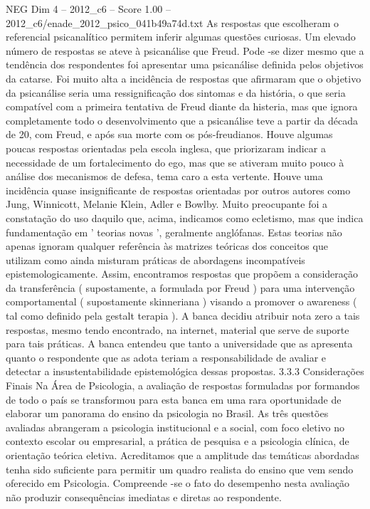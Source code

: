 \begin{textsample}{NEG Dim 4 – 2012\_c6 – Score 1.00 – 2012\_c6/enade\_2012\_psico\_041b49a74d.txt}
As respostas que escolheram o referencial psicanalítico permitem inferir algumas questões curiosas.
Um elevado número de respostas se ateve à psicanálise que Freud.
Pode -se dizer mesmo que a tendência dos respondentes foi apresentar uma psicanálise definida pelos objetivos da catarse.
Foi muito alta a incidência de respostas que afirmaram que o objetivo da psicanálise seria uma ressignificação dos sintomas e da história, o que seria compatível com a primeira tentativa de Freud diante da histeria, mas que ignora completamente todo o desenvolvimento que a psicanálise teve a partir da década de 20, com Freud, e após sua morte com os pós-freudianos.
Houve algumas poucas respostas orientadas pela escola inglesa, que priorizaram indicar a necessidade de um fortalecimento do ego, mas que se ativeram muito pouco à análise dos mecanismos de defesa, tema caro a esta vertente.
Houve uma incidência quase insignificante de respostas orientadas por outros autores como Jung, Winnicott, Melanie Klein, Adler e Bowlby.
Muito preocupante foi a constatação do uso daquilo que, acima, indicamos como ecletismo, mas que indica fundamentação em ' teorias novas ', geralmente anglófanas.
Estas teorias não apenas ignoram qualquer referência às matrizes teóricas dos conceitos que utilizam como ainda misturam práticas de abordagens incompatíveis epistemologicamente.
Assim, encontramos respostas que propõem a consideração da transferência ( supostamente, a formulada por Freud ) para uma intervenção comportamental ( supostamente skinneriana ) visando a promover o awareness ( tal como definido pela gestalt terapia ).
A banca decidiu atribuir nota zero a tais respostas, mesmo tendo encontrado, na internet, material que serve de suporte para tais práticas.
A banca entendeu que tanto a universidade que as apresenta quanto o respondente que as adota teriam a responsabilidade de avaliar e detectar a insustentabilidade epistemológica dessas propostas. 3.3.3 Considerações Finais Na Área de Psicologia, a avaliação de respostas formuladas por formandos de todo o país se transformou para esta banca em uma rara oportunidade de elaborar um panorama do ensino da psicologia no Brasil.
As três questões avaliadas abrangeram a psicologia institucional e a social, com foco eletivo no contexto escolar ou empresarial, a prática de pesquisa e a psicologia clínica, de orientação teórica eletiva.
Acreditamos que a amplitude das temáticas abordadas tenha sido suficiente para permitir um quadro realista do ensino que vem sendo oferecido em Psicologia.
Compreende -se o fato do desempenho nesta avaliação não produzir consequências imediatas e diretas ao respondente.

\end{textsample}
